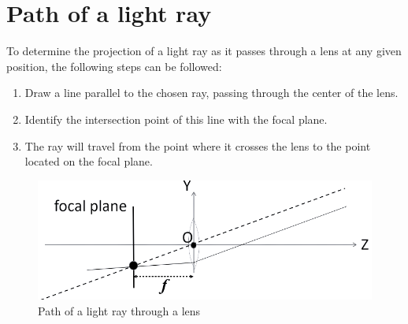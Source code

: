 \section{Path of a light ray}

To determine the projection of a light ray as it passes through a lens at any given position, the following steps can be followed:
\begin{enumerate}
    \item Draw a line parallel to the chosen ray, passing through the center of the lens. 
    \item Identify the intersection point of this line with the focal plane.
    \item The ray will travel from the point where it crosses the lens to the point located on the focal plane.
\end{enumerate}
\begin{figure}[H]
    \centering
    \includegraphics[width=0.4\linewidth]{images/path.png}
    \caption{Path of a light ray through a lens}
\end{figure}